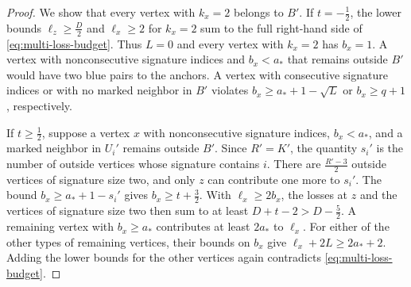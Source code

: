\documentclass[preprint,11pt,numbers]{elsarticle-arxiv}
\numberwithin{equation}{section}
\theoremstyle{definition}
\begin{document}
\begin{proof}
We show that every vertex with $k_x=2$ belongs to $B'$. If
$t=-\frac{1}{2}$, the lower bounds $\ell_z\ge\frac{D}{2}$ and
$\ell_x\ge2$ for $k_x=2$ sum to the full right-hand side of
\eqref{eq:multi-loss-budget}. Thus $L=0$ and every vertex
with $k_x=2$ has $b_x=1$. A vertex with nonconsecutive
signature indices and $b_x<a_*$ that remains outside $B'$
would have two blue pairs to the anchors. A vertex with
consecutive signature indices or with no marked neighbor in $B'$
violates $b_x\ge a_*+1-\sqrt L$ or $b_x\ge q+1$, respectively.

If $t\ge\frac{1}{2}$, suppose a vertex $x$ with nonconsecutive
signature indices, $b_x<a_*$, and a marked neighbor in $U_i'$
remains outside $B'$. Since $R'=K'$, the quantity $s_i'$ is the
number of outside vertices whose signature contains $i$.
There are $\frac{R'-3}{2}$ outside vertices of signature size
two, and only $z$ can contribute one more to $s_i'$. The bound
$b_x\ge a_*+1-s_i'$ gives $b_x\ge t+\frac{3}{2}$. With
$\ell_x\ge2b_x$, the losses at $z$ and the vertices of signature
size two then sum to at least $D+t-2>D-\frac{5}{2}$.
A remaining vertex with $b_x\ge a_*$ contributes at least
$2a_*$ to $\ell_x$. For either of the other types of remaining
vertices, their bounds on $b_x$ give $\ell_x+2L\ge2a_*+2$.
Adding the lower bounds for the other vertices again contradicts
\eqref{eq:multi-loss-budget}.


\end{proof}
\end{document}
